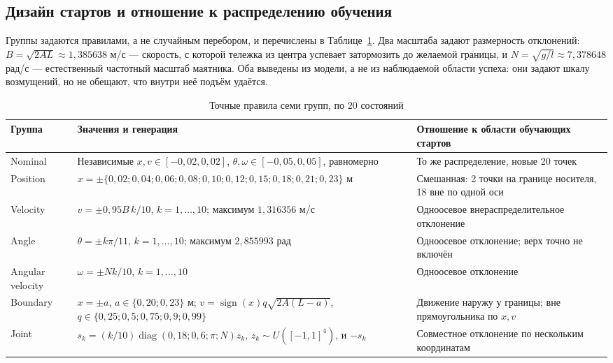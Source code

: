 \subsection{Дизайн стартов и отношение к распределению обучения}
Группы задаются правилами, а не случайным перебором, и перечислены в Таблице~\ref{tab:groups}. Два масштаба задают размерность отклонений: $B=\sqrt{2AL}\approx1{,}385638$ м/с — скорость, с которой тележка из центра успевает затормозить до желаемой границы, и $N=\sqrt{g/l}\approx7{,}378648$ рад/с — естественный частотный масштаб маятника. Оба выведены из модели, а не из наблюдаемой области успеха: они задают шкалу возмущений, но не обещают, что внутри неё подъём удаётся.
\begin{table}[htbp]\caption{Точные правила семи групп, по 20 состояний}\label{tab:groups}
\begin{smalltable}\begin{tabularx}{\linewidth}{@{}p{27mm}X p{40mm}@{}}\toprule
Группа & Значения и генерация & Отношение к области обучающих стартов\\\midrule
Nominal & Независимые $x,v\in[-0{,}02,0{,}02]$, $\theta,\omega\in[-0{,}05,0{,}05]$, равномерно & То же распределение, новые 20 точек\\
Position & $x=\pm\{0{,}02;0{,}04;0{,}06;0{,}08;0{,}10;0{,}12;0{,}15;0{,}18;0{,}21;0{,}23\}$ м & Смешанная: 2 точки на границе носителя, 18 вне по одной оси\\
Velocity & $v=\pm0{,}95B\,k/10$, $k=1,\ldots,10$; максимум $1{,}316356$ м/с & Одноосевое внераспределительное отклонение\\
Angle & $\theta=\pm k\pi/11$, $k=1,\ldots,10$; максимум $2{,}855993$ рад & Одноосевое отклонение; верх точно не включён\\
Angular velocity & $\omega=\pm Nk/10$, $k=1,\ldots,10$ & Одноосевое отклонение\\
Boundary & $x=\pm a$, $a\in\{0{,}20;0{,}23\}$ м; $v=\operatorname{sign}(x)q\sqrt{2A(L-a)}$, $q\in\{0{,}25;0{,}5;0{,}75;0{,}9;0{,}99\}$ & Движение наружу у границы; вне прямоугольника по $x,v$\\
Joint & $s_k=(k/10)\operatorname{diag}(0{,}18;0{,}6;\pi;N)z_k$, $z_k\sim U([-1,1]^4)$, и $-s_k$ & Совместное отклонение по нескольким координатам\\\bottomrule
\end{tabularx}\end{smalltable}
\end{table}

